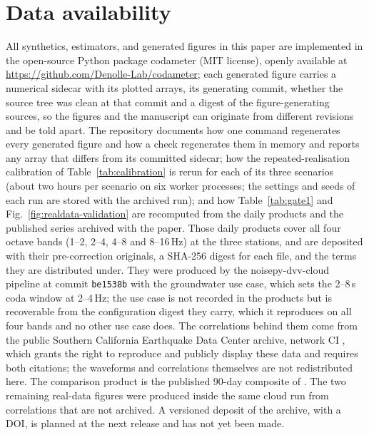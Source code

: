 \documentclass[
  referee]{gji}
\begin{document}


\section*{Data availability}\label{data-availability}

All synthetics, estimators, and generated figures in this paper are
implemented in the open-source Python package codameter (MIT license),
openly available at \url{https://github.com/Denolle-Lab/codameter}; each
generated figure carries a numerical sidecar with its plotted arrays,
its generating commit, whether the source tree was clean at that commit
and a digest of the figure-generating sources, so the figures and the
manuscript can originate from different revisions and be told apart. The
repository documents how one command regenerates every generated figure
and how a check regenerates them in memory and reports any array that
differs from its committed sidecar; how the repeated-realisation
calibration of Table~\ref{tab:calibration} is rerun for each of its
three scenarios (about two hours per scenario on six worker processes;
the settings and seeds of each run are stored with the archived run);
and how Table~\ref{tab:gate1} and Fig.~\ref{fig:realdata-validation} are
recomputed from the daily products and the published
\citet{Clements2023} series archived with the paper. Those daily
products cover all four octave bands (1--2, 2--4, 4--8 and
8--16\(\,\)Hz) at the three stations, and are deposited with their
pre-correction originals, a SHA-256 digest for each file, and the terms
they are distributed under. They were produced by the noisepy-dvv-cloud
pipeline at commit \texttt{be1538b} with the groundwater use case, which
sets the 2--8\(\,\)s coda window at 2--4\(\,\)Hz; the use case is not
recorded in the products but is recoverable from the configuration
digest they carry, which it reproduces on all four bands and no other
use case does. The correlations behind them come from the public
Southern California Earthquake Data Center archive, network CI
\citep{SCEDC2013, SCSN1926}, which grants the right to reproduce and
publicly display these data and requires both citations; the waveforms
and correlations themselves are not redistributed here. The comparison
product is the published 90-day composite of \citet{Clements2023}. The
two remaining real-data figures were produced inside the same cloud run
from correlations that are not archived. A versioned deposit of the
archive, with a DOI, is planned at the next release and has not yet been
made.
\end{document}
